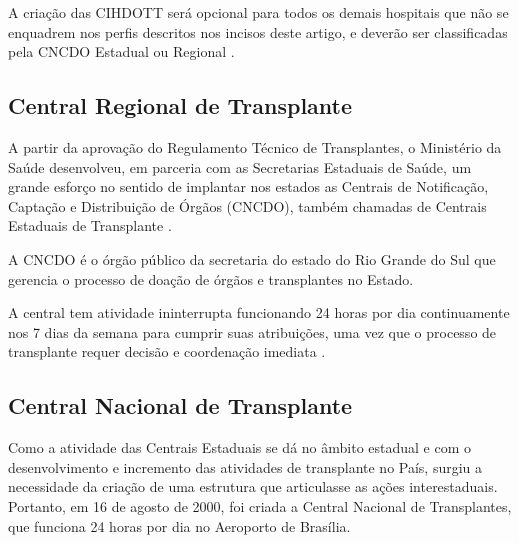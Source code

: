\documentclass[portuguese,oneside]{tcc}
\begin{document}
A criação das CIHDOTT será opcional para todos os demais hospitais que não se enquadrem nos perfis descritos nos incisos deste artigo, e deverão ser classificadas pela CNCDO Estadual ou Regional \cite{BVSMS}.


\subsection{Central Regional de Transplante}
A partir da aprovação do Regulamento Técnico de Transplantes, o Ministério da Saúde desenvolveu, em parceria com as Secretarias Estaduais de Saúde, um grande esforço no sentido de implantar nos estados as Centrais de Notificação, Captação e Distribuição de Órgãos (CNCDO), também chamadas de Centrais Estaduais de Transplante \cite{SEST}. 

A CNCDO é o órgão público da secretaria do estado do Rio Grande do Sul que gerencia o processo de doação de órgãos e transplantes no Estado.

A central tem atividade ininterrupta funcionando 24 horas por dia continuamente nos 7 dias da semana para cumprir suas atribuições, uma vez que o processo de transplante requer decisão e coordenação imediata \cite{SCSCT}.

\subsection{Central Nacional de Transplante}
Como a atividade das Centrais Estaduais se dá no âmbito estadual e com o desenvolvimento e incremento das atividades de transplante no País, surgiu a necessidade da criação de uma estrutura que articulasse as ações interestaduais. Portanto, em 16 de agosto de 2000, foi criada a Central Nacional de Transplantes, que funciona 24 horas por dia no Aeroporto de Brasília. 
\end{document}
